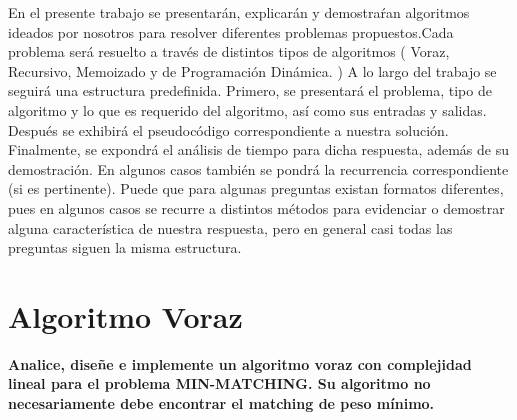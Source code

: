 \documentclass[12pt,a4,paper]{article}
\begin{document}
En el presente trabajo se presentar\'an, explicar\'an y demostra\'ran algoritmos ideados por nosotros para resolver diferentes problemas propuestos.\newline Cada problema ser\'a resuelto a trav\'es de distintos tipos de algoritmos ( Voraz, Recursivo, Memoizado y de Programaci\'on Din\'amica. )
\newline\newline 
A lo largo del trabajo se seguir\'a una estructura predefinida.\newline
Primero, se presentar\'a el problema, tipo de algoritmo y lo que es requerido del algoritmo, as\'i como sus entradas y salidas. Despu\'es se exhibir\'a el pseudoc\'odigo correspondiente a nuestra soluci\'on. Finalmente, se expondr\'a el an\'alisis de tiempo para dicha respuesta, adem\'as de su demostraci\'on. En algunos casos tambi\'en se pondr\'a la recurrencia correspondiente (si es pertinente).\newline\newline
Puede que para algunas preguntas existan formatos diferentes, pues en algunos casos se recurre a distintos m\'etodos para evidenciar o demostrar alguna caracter\'istica de nuestra respuesta, pero en general casi todas las preguntas siguen la misma estructura.



\newpage

\section{Algoritmo Voraz} 
\textbf{Analice, diseñe e implemente un algoritmo voraz con complejidad lineal para el problema \textsc{MIN-MATCHING}. Su algoritmo no necesariamente debe encontrar el matching de peso mínimo.}\\
\end{document}

